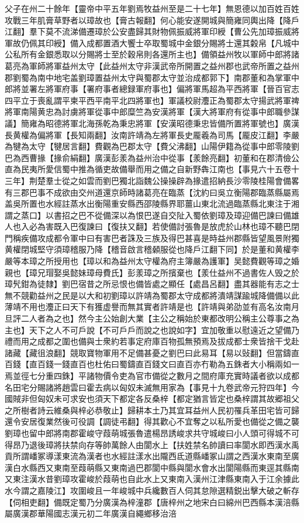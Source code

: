 父子在州二十餘年【靈帝中平五年劉焉牧益州至是二十七年】無恩德以加百姓百姓攻戰三年肌膏草野者以璋故也【膏古報翻】何心能安遂開城與簡雍同輿出降【降戶江翻】羣下莫不流涕備遷璋於公安盡歸其財物佩振威將軍印綬【曹公先加璋振威將軍故仍佩其印綬】備入成都置酒大饗士卒取蜀城中金銀分賜將士還其糓帛【凡城中公私所有金銀悉取以分賜將士至於穀帛則各還所主也】備領益州牧以軍師中郎將諸葛亮為軍師將軍益州太守【此益州太守非漢武帝所開置之益州郡也武帝所置之益州郡劉蜀為南中地宅盖劉璋置益州太守與蜀郡太守並治成都郭下】南郡董和為掌軍中郎將並署左將軍府事【署府事者總録軍府事也】偏將軍馬超為平西將軍【晉百官志四平立于喪亂謂平柬平西平南平北四將軍也】軍議校尉灋正為蜀郡太守揚武將軍禆將軍南陽黄忠為討虜將軍從事中郎糜竺為安漢將軍【漢大將軍府有從事中郎職參謀議】簡雍為昭德將軍北海孫乾為秉忠將軍【安漢昭德秉忠皆備所置將軍號也】廣漢長黄權為偏將軍【長知兩翻】汝南許靖為左將軍長史龎羲為司馬【龎皮江翻】李嚴為犍為太守【犍居言翻】費觀為巴郡太守【費父沸翻】山陽伊籍為從事中郎零陵劉巴為西曹掾【掾俞絹翻】廣漢彭羕為益州治中從事【羕餘亮翻】初董和在郡清儉公直為民夷所愛信蜀中推為循吏故備舉而用之備之自新野犇江南也【事見六十五卷十三年】荆楚羣士從之如雲而劉巴獨北詣魏公操操辟為掾遣招納長沙零陵桂陽會備畧有三郡巴事不成欲由交州道還京師時諸葛亮在臨蒸【沈約曰吳立衡陽郡臨蒸縣屬焉盖吳所置也水經註蒸水出衡陽重安縣西邵陵縣界耶薑山東北流過臨蒸縣北東注于湘謂之蒸口】以書招之巴不從備深以為恨巴遂自交阯入蜀依劉璋及璋迎備巴諫曰備雄人也入必為害既入巴復諫曰【復扶又翻】若使備討張魯是放虎於山林也璋不聽巴閉門稱疾備攻成都令軍中曰有害巴者誅及三族及得巴甚喜是時益州郡縣皆望風景附獨黄權閉城堅守須璋稽服乃降【稽音啟言稽顙服從也降戶江翻下同】於是董和黄權李嚴等本璋之所授用也【璋以和為益州太守權為府主簿嚴為護軍】吴懿費觀等璋之婚親也【璋兄瑁娶吳懿妹璋母費氏】彭羕璋之所擯棄也【羕仕益州不過書佐人毁之於璋髠鉗為徒隸】劉巴宿昔之所忌恨也備皆處之顯任【處昌呂翻】盡其器能有志之士無不競勸益州之民是以大和初劉璋以許靖為蜀郡太守成都將潰靖謀踰城降備備以此薄靖不用也灋正曰天下有獲虚譽而無其實者許靖是也【許靖與弟劭並有高名汝南月旦評二人者為之也】然今主公始創大業【主公之稱始於東都改明公稱主公尊事之為主也】天下之人不可戶說【不可戶戶而說之也說如字】宜加敬重以慰遠近之望備乃禮而用之成都之圍也備與士衆約若事定府庫百物孤無預焉及拔成都士衆皆捨干戈赴諸藏【藏徂浪翻】競取寶物軍用不足備甚憂之劉巴曰此易耳【易以䜴翻】但當鑄直百錢【直百錢一錢直百也杜佑曰蜀鑄直百錢文曰直百亦冇勒為五銖者大小稱兩如一焉並徑七分重四銖】平諸物價令吏為官市備從之數月之間府庫充實時議者欲以成都名田宅分賜諸將趙雲曰霍去病以匈奴未滅無用家為【事見十九卷武帝元狩四年】今國賊非但匈奴未可求安也須天下都定各反桑梓【都定猶言皆定也桑梓謂其故郷祖父之所樹者詩云維桑與梓必恭敬止】歸耕本土乃其宜耳益州人民初罹兵革田宅皆可歸還令安居復業然後可役調【調徒弔翻】得其歡心不宜奪之以私所愛也備從之備之襲劉璋也留中郎將南郡霍峻守葭萌城張魯遣楊昂誘峻求共守城峻曰小人頭可得城不可得昂乃退後璋將扶禁向存等帥萬餘人由閬水上【扶姓禁名帥讀曰率閬水即西漢水禹貢所謂嶓冢導漾東流為漢者也水經註漾水出隴西氐道縣嶓冢山謂之西漢水東南至廣漢白水縣西又東南至葭萌縣又東南過巴郡閬中縣與閬水會水出閬陽縣而東逕其縣南又東注漢水昔劉璋攻霍峻於葭萌也自此水上又東南入漢州江津縣東南入于江余據此水今謂之嘉陵江】攻圍峻且一年峻城中兵纔數百人伺其怠隙選精鋭出擊大破之斬存【伺相吏翻】備既定蜀乃分廣漢為梓潼郡【唐梓州之地宋白曰綿州巴西縣本漢涪縣屬廣漢郡華陽國志漢元初二年廣漢自繩鄉移治涪